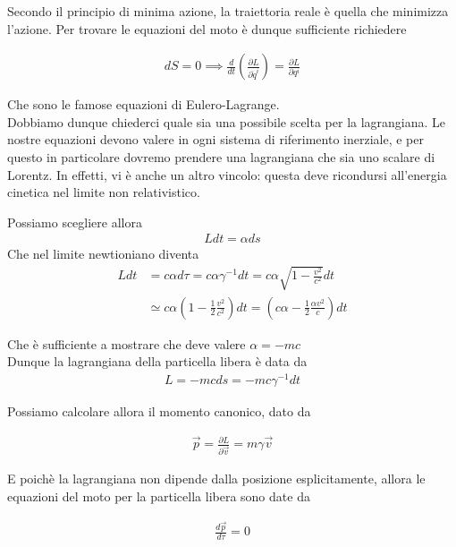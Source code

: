 \documentclass{report}
\begin{document}
Secondo il principio di minima azione, la traiettoria reale è quella che minimizza l'azione. Per trovare le equazioni del moto è dunque sufficiente richiedere 

\begin{align}
    dS = 0 \implies \frac{d}{dt}\left(\frac{\partial L}{\partial \dot{q}^i} \right) = \frac{\partial L}{\partial q^i}
\end{align}

Che sono le famose equazioni di Eulero-Lagrange. \\

Dobbiamo dunque chiederci quale sia una possibile scelta per la lagrangiana. Le nostre equazioni devono valere in ogni sistema di riferimento inerziale, e per questo in particolare dovremo prendere una lagrangiana che sia uno scalare di Lorentz. 
In effetti, vi è anche un altro vincolo: questa deve ricondursi all'energia cinetica nel limite non relativistico. 

Possiamo scegliere allora 
\begin{align}
    Ldt = \alpha ds
\end{align}
Che nel limite newtioniano diventa 
\begin{align}
    Ldt &= c\alpha d\tau = c\alpha \gamma^{-1}dt = c\alpha \sqrt{1 - \frac{v^2}{c^2}}dt \\ &\simeq c\alpha\left(1 - \frac{1}{2}\frac{v^2}{c^2}\right)dt = \left(c\alpha -\frac{1}{2}\frac{\alpha v^2}{c} \right)dt
\end{align}

Che è sufficiente a mostrare che deve valere \(\alpha = -mc\) \\

Dunque la lagrangiana della particella libera è data da 
\begin{align}
    L = -mc ds = -mc \gamma^{-1}dt
\end{align}

Possiamo calcolare allora il momento canonico, dato da 


\begin{align}
    \vec{p} = \frac{\partial L}{\partial \vec{v}} = m\gamma \vec{v}
\end{align}

E poichè la lagrangiana non dipende dalla posizione esplicitamente, allora le equazioni del moto per la particella libera sono date da 

\begin{align}
    \frac{d \vec{p}}{d\tau} = 0
\end{align}
\end{document}
